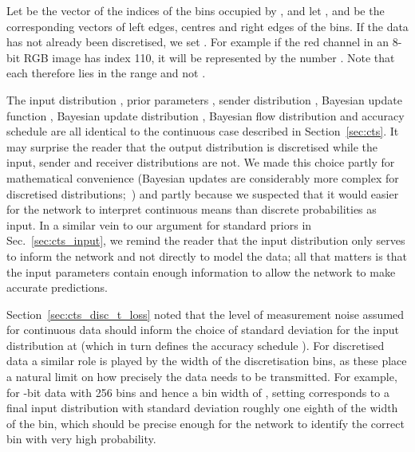 \documentclass[11pt,table]{article}
\newcommand{\0}[1]{\constvec{0}{#1}}
\newcommand{\1}[1]{\constvec{1}{#1}}
\begin{document}
Let  be the vector of the indices of the bins occupied by , and let ,  and  be the corresponding vectors of left edges, centres and right edges of the bins.
If the data has not already been discretised, we set .
For example if the red channel in an 8-bit RGB image has index 110, it will be represented by the number .
Note that each  therefore lies in the range  and not .

The input distribution , prior parameters , sender distribution , Bayesian update function , Bayesian update distribution , Bayesian flow distribution  and accuracy schedule  are all identical to the continuous case described in Section~\ref{sec:cts}. 
It may surprise the reader that the output distribution is discretised while the input, sender and receiver distributions are not.
We made this choice partly for mathematical convenience (Bayesian updates are considerably more complex for discretised distributions;~\citep{austin2021d3pm}) and partly because we suspected that it would easier for the network to interpret continuous means than discrete probabilities as input.
In a similar vein to our argument for standard priors in Sec.~\ref{sec:cts_input}, we remind the reader that the input distribution only serves to inform the network and not directly to model the data; all that matters is that the input parameters contain enough information to allow the network to make accurate predictions.

Section~\ref{sec:cts_disc_t_loss} noted that the level of measurement noise assumed for continuous data should inform the choice of standard deviation  for the input distribution at  (which in turn defines the accuracy schedule ).
For discretised data a similar role is played by the width of the discretisation bins, as these place a natural limit on how precisely the data needs to be transmitted.
For example, for -bit data with 256 bins and hence a bin width of , setting  corresponds to a final input distribution with standard deviation roughly one eighth of the width of the bin, which should be precise enough for the network to identify the correct bin with very high probability.
\end{document}
